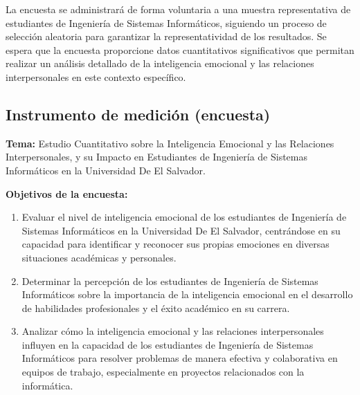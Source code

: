 \documentclass[journal]{IEEEtran}
\begin{document}
La encuesta se administrará de forma voluntaria a una muestra representativa de estudiantes de Ingeniería de Sistemas Informáticos, siguiendo un proceso de selección aleatoria para garantizar la representatividad de los resultados. Se espera que la encuesta proporcione datos cuantitativos significativos que permitan realizar un análisis detallado de la inteligencia emocional y las relaciones interpersonales en este contexto específico.

\subsection{Instrumento de medición (encuesta)}

\textbf{Tema:} Estudio Cuantitativo sobre la Inteligencia Emocional y las Relaciones Interpersonales, y su Impacto en Estudiantes de Ingeniería de Sistemas Informáticos en la Universidad De El Salvador.

\textbf{Objetivos de la encuesta:}
\begin{enumerate}
	\item Evaluar el nivel de inteligencia emocional de los estudiantes de Ingeniería de Sistemas Informáticos en la Universidad De El Salvador, centrándose en su capacidad para identificar y reconocer sus propias emociones en diversas situaciones académicas y personales.
	\item Determinar la percepción de los estudiantes de Ingeniería de Sistemas Informáticos sobre la importancia de la inteligencia emocional en el desarrollo de habilidades profesionales y el éxito académico en su carrera.
	\item Analizar cómo la inteligencia emocional y las relaciones interpersonales influyen en la capacidad de los estudiantes de Ingeniería de Sistemas Informáticos para resolver problemas de manera efectiva y colaborativa en equipos de trabajo, especialmente en proyectos relacionados con la informática.
\end{enumerate}
\end{document}
